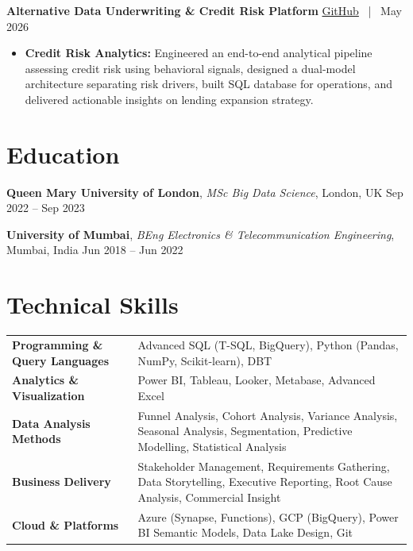 \documentclass[10pt, a4paper]{article}
\begin{document}
\textbf{Alternative Data Underwriting \& Credit Risk Platform} \hfill \href{https://github.com/VishalP44/Thin-File-Borrower-Risk-Assessment-Platform}{GitHub} \, | \, May 2026
\begin{itemize}
    \item \textbf{Credit Risk Analytics:} Engineered an end-to-end analytical pipeline assessing credit risk using behavioral signals, designed a dual-model architecture separating risk drivers, built SQL database for operations, and delivered actionable insights on lending expansion strategy.
\end{itemize}

\section*{Education}

\textbf{Queen Mary University of London}, \textit{MSc Big Data Science}, London, UK \hfill Sep 2022 -- Sep 2023

\vspace{4pt}

\textbf{University of Mumbai}, \textit{BEng Electronics \& Telecommunication Engineering}, Mumbai, India \hfill Jun 2018 -- Jun 2022

\section*{Technical Skills}

\begin{tabularx}{\textwidth}{>{\bfseries}l X}
    Programming \& Query Languages & Advanced SQL (T-SQL, BigQuery), Python (Pandas, NumPy, Scikit-learn), DBT \\
    Analytics \& Visualization & Power BI, Tableau, Looker, Metabase, Advanced Excel \\
    Data Analysis Methods & Funnel Analysis, Cohort Analysis, Variance Analysis, Seasonal Analysis, Segmentation, Predictive Modelling, Statistical Analysis \\
    Business Delivery & Stakeholder Management, Requirements Gathering, Data Storytelling, Executive Reporting, Root Cause Analysis, Commercial Insight \\
    Cloud \& Platforms & Azure (Synapse, Functions), GCP (BigQuery), Power BI Semantic Models, Data Lake Design, Git
\end{tabularx}
\end{document}
